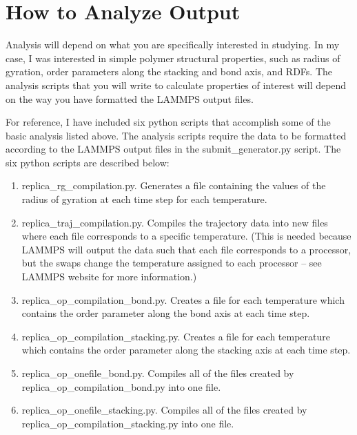 \documentclass{article}
\begin{document}
\section{How to Analyze Output}
Analysis will depend on what you are specifically interested in studying. In my case, I was interested in simple polymer structural properties, such as radius of gyration, order parameters along the stacking and bond axis, and RDFs. The analysis scripts that you will write to calculate properties of interest will depend on the way you have formatted the LAMMPS output files. 

For reference, I have included six python scripts that accomplish some of the basic analysis listed above. The analysis scripts require the data to be formatted according to the LAMMPS output files in the submit\_generator.py script. The six python scripts are described below:
\begin{enumerate}
    \item replica\_rg\_compilation.py. Generates a file containing the values of the radius of gyration at each time step for each temperature.
    \item replica\_traj\_compilation.py. Compiles the trajectory data into new files where each file corresponds to a specific temperature. (This is needed because LAMMPS will output the data such that each file corresponds to a processor, but the swaps change the temperature assigned to each processor -- see LAMMPS website for more information.)
    \item replica\_op\_compilation\_bond.py. Creates a file for each temperature which contains the order parameter along the bond axis at each time step.
    \item replica\_op\_compilation\_stacking.py. Creates a file for each temperature which contains the order parameter along the stacking axis at each time step.
    \item replica\_op\_onefile\_bond.py. Compiles all of the files created by \newline replica\_op\_compilation\_bond.py into one file.
    \item replica\_op\_onefile\_stacking.py. Compiles all of the files created by \newline replica\_op\_compilation\_stacking.py into one file.
\end{enumerate}
\end{document}
